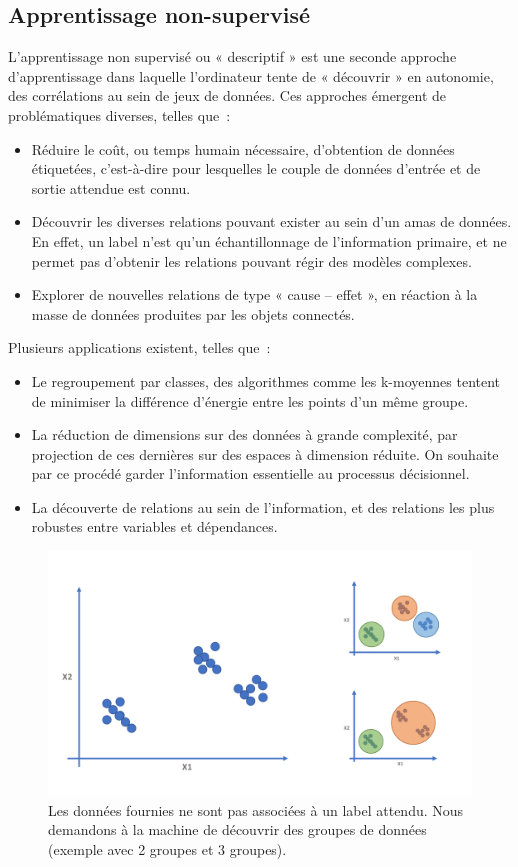 \subsection{Apprentissage non-supervisé}
\label{sec:unsupervised_learning}
L’apprentissage non supervisé ou « descriptif » est une seconde approche d’apprentissage dans laquelle l’ordinateur tente de « découvrir » en autonomie, des corrélations au sein de jeux de données. Ces approches émergent de problématiques diverses, telles que~:
\begin{itemize}
    \item Réduire le coût, ou temps humain nécessaire, d’obtention de données étiquetées, c’est-à-dire pour lesquelles le couple de données d’entrée et de sortie attendue est connu.
    \item Découvrir les diverses relations pouvant exister au sein d’un amas de données. En effet, un label n’est qu’un échantillonnage de l’information primaire, et ne permet pas d’obtenir les relations pouvant régir des modèles complexes.
    \item Explorer de nouvelles relations de type « cause – effet », en réaction à la masse de données produites par les objets connectés. 
\end{itemize}\par

Plusieurs applications existent, telles que~:
\begin{itemize}
	\item Le regroupement par classes, des algorithmes comme les k-moyennes tentent de minimiser la différence d’énergie entre les points d’un même groupe.
	\item La réduction de dimensions sur des données à grande complexité, par projection de ces dernières sur des espaces à dimension réduite. On souhaite par ce procédé garder l’information essentielle au processus décisionnel.
	\item La découverte de relations au sein de l’information, et des relations les plus robustes entre variables et dépendances.
\end{itemize}\par
 
\begin{figure}[H]
    \centering
    \includegraphics[width=0.8\linewidth]{contents/chapter_3/resources/scheme_unsupervised.pdf}
    \caption{Les données fournies ne sont pas associées à un label attendu. Nous demandons à la machine de découvrir des groupes de données (exemple avec 2 groupes et 3 groupes).}
    \label{fig:scheme_unsupervised}
\end{figure}

